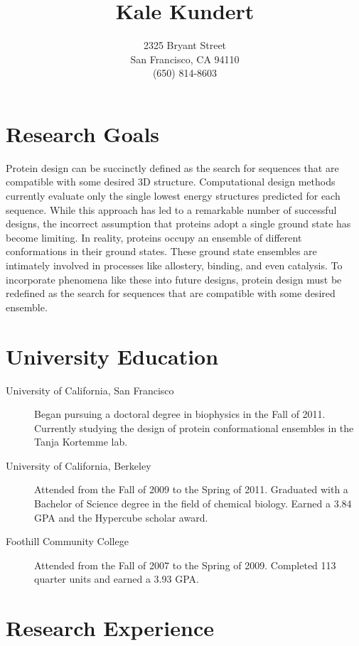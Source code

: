 \documentclass{article}
\title{Kale Kundert}
\author{2325 Bryant Street\\San Francisco, CA 94110\\(650) 814-8603}
\date{}
\begin{document}
 \maketitle

 \pagestyle{empty}
 \thispagestyle{empty}

 \section*{Research Goals}

  Protein design can be succinctly defined as the search for sequences that are 
  compatible with some desired 3D structure.  Computational design methods 
  currently evaluate only the single lowest energy structures predicted for 
  each sequence.  While this approach has led to a remarkable number of 
  successful designs, the incorrect assumption that proteins adopt a single 
  ground state has become limiting.  In reality, proteins occupy an ensemble of 
  different conformations in their ground states.  These ground state ensembles 
  are intimately involved in processes like allostery, binding, and even 
  catalysis.  To incorporate phenomena like these into future designs, protein 
  design must be redefined as the search for sequences that are compatible with 
  some desired ensemble.

 \section*{University Education}

  \begin{description}
   \item[University of California, San Francisco] Began pursuing a doctoral 
   degree in biophysics in the Fall of 2011.  Currently studying the design of 
   protein conformational ensembles in the Tanja Kortemme lab.
   
   \item[University of California, Berkeley] Attended from the Fall of 2009 to
   the Spring of 2011.  Graduated with a Bachelor of Science degree in the
   field of chemical biology.  Earned a 3.84 GPA and the Hypercube scholar
   award.
   
   \item[Foothill Community College] Attended from the Fall of 2007 to the
   Spring of 2009.  Completed 113 quarter units and earned a 3.93 GPA.
  \end{description}

 \section*{Research Experience}
\end{document}
